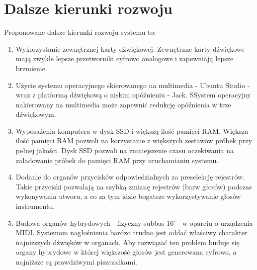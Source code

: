 \documentclass[11pt]{report}
\begin{document}
    \section{Dalsze kierunki rozwoju}\label{sec:dalsze-kierunki-rozwoju}
    Proponowane dalsze kierunki rozwoju systemu to:
    \begin{enumerate}
        \item Wykorzystanie zewnętrznej karty dźwiękowej.
        Zewnętrzne karty dźwiękowe mają zwykle lepsze przetworniki cyfrowo analogowe i zapewniają lepsze brzmienie.
        \item Użycie systemu operacyjnego skierowanego na multimedia - Ubuntu Studio - wraz z platformą dźwiękową o niskim opóźnieniu - Jack.
        SSystem operacyjny nakierowany na multimedia może zapewnić redukcję opóźnienia w trze dźwiękowym.
        \item Wyposażenia komputera w dysk SSD i większą ilość pamięci RAM.
        Większa ilość pamięci RAM pozwoli na korzystanie z większych zestawów próbek przy pełnej jakości.
        Dysk SSD pozwoli na zmniejszenie czasu oczekiwania na załadowanie próbek do pamięci RAM przy uruchamianiu systemu.
        \item Dodanie do organów przycisków odpowiedzialnych za preselekcję rejestrów.
        Takie przyciski pozwalają na szybką zmianę rejestrów (barw głosów) podczas wykonywania utworu, a co za tym idzie bogatsze wykorzystywanie głosów instrumentu.
        \item Budowa organów hybrydowych - fizyczny subbas 16' - w oparciu o urządzenia MIDI.
        Systemom nagłośnienia bardzo trudno jest oddać właściwy charakter najniższych dźwięków w organach.
        Aby rozwiązać ten problem buduje się organy hybrydowe w której większość głosów jest generowana cyfrowo, a najniższe są prawdziwymi piszczałkami.
    \end{enumerate}


    \newpage

    \printbibliography[title={Bibliografia}]
\end{document}

